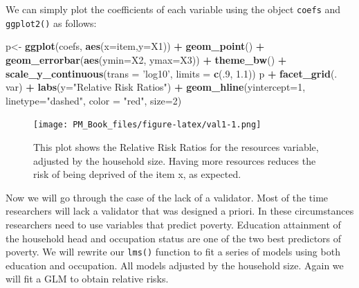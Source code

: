 \documentclass[]{book}
\newenvironment{Shaded}{\begin{snugshade}}{\end{snugshade}}
\newcommand{\DataTypeTok}[1]{\textcolor[rgb]{0.13,0.29,0.53}{#1}}
\newcommand{\DecValTok}[1]{\textcolor[rgb]{0.00,0.00,0.81}{#1}}
\newcommand{\FloatTok}[1]{\textcolor[rgb]{0.00,0.00,0.81}{#1}}
\newcommand{\KeywordTok}[1]{\textcolor[rgb]{0.13,0.29,0.53}{\textbf{#1}}}
\newcommand{\NormalTok}[1]{#1}
\newcommand{\OperatorTok}[1]{\textcolor[rgb]{0.81,0.36,0.00}{\textbf{#1}}}
\newcommand{\StringTok}[1]{\textcolor[rgb]{0.31,0.60,0.02}{#1}}
\begin{document}
We can simply plot the coefficients of each variable using the object \texttt{coefs} and \texttt{ggplot2()} as follows:

\begin{Shaded}
\begin{Highlighting}[]
\NormalTok{p<-}\StringTok{ }\KeywordTok{ggplot}\NormalTok{(coefs, }\KeywordTok{aes}\NormalTok{(}\DataTypeTok{x=}\NormalTok{item,}\DataTypeTok{y=}\NormalTok{X1)) }\OperatorTok{+}\StringTok{ }\KeywordTok{geom_point}\NormalTok{() }\OperatorTok{+}\StringTok{  }
\StringTok{  }\KeywordTok{geom_errorbar}\NormalTok{(}\KeywordTok{aes}\NormalTok{(}\DataTypeTok{ymin=}\NormalTok{X2, }\DataTypeTok{ymax=}\NormalTok{X3)) }\OperatorTok{+}
\StringTok{ }\KeywordTok{theme_bw}\NormalTok{() }\OperatorTok{+}\StringTok{ }\KeywordTok{scale_y_continuous}\NormalTok{(}\DataTypeTok{trans =} \StringTok{'log10'}\NormalTok{, }\DataTypeTok{limits =} \KeywordTok{c}\NormalTok{(.}\DecValTok{9}\NormalTok{, }\FloatTok{1.1}\NormalTok{))}
\NormalTok{p }\OperatorTok{+}\StringTok{ }\KeywordTok{facet_grid}\NormalTok{(. }\OperatorTok{~}\StringTok{ }\NormalTok{var) }\OperatorTok{+}\StringTok{ }\KeywordTok{labs}\NormalTok{(}\DataTypeTok{y=}\StringTok{"Relative Risk Ratios"}\NormalTok{) }\OperatorTok{+}\StringTok{ }\KeywordTok{geom_hline}\NormalTok{(}\DataTypeTok{yintercept=}\DecValTok{1}\NormalTok{, }\DataTypeTok{linetype=}\StringTok{"dashed"}\NormalTok{,}
                \DataTypeTok{color =} \StringTok{"red"}\NormalTok{, }\DataTypeTok{size=}\DecValTok{2}\NormalTok{)}
\end{Highlighting}
\end{Shaded}

\begin{figure}
\centering
\texttt{[image: PM\_Book\_files/figure-latex/val1-1.png]}
\caption{\label{fig:val1}This plot shows the Relative Risk Ratios for the resources variable, adjusted by the household size. Having more resources reduces the risk of being deprived of the item x, as expected.}
\end{figure}

Now we will go through the case of the lack of a validator. Most of the time researchers will lack a validator that was designed a priori. In these circumstances researchers need to use variables that predict poverty. Education attainment of the household head and occupation status are one of the two best predictors of poverty. We will rewrite our \texttt{lms()} function to fit a series of models using both education and occupation. All models adjusted by the household size. Again we will fit a GLM to obtain relative risks.
\end{document}
